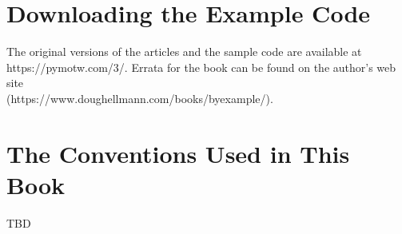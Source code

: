 \section*{Downloading the Example Code}

The original versions of the articles and the sample code are
available at https://pymotw.com/3/.  Errata for the book can be found
on the author's web site\\
(https://www.doughellmann.com/books/byexample/).

\section*{The Conventions Used in This Book}

TBD

